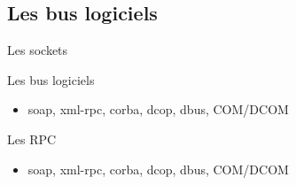 \subsection{Les bus logiciels}

\begin{frame}[fragile=singleslide]{Les sockets}
\end{frame} 

\begin{frame}[fragile=singleslide]{Les bus logiciels}
  \begin{itemize}  
    \item soap, xml-rpc, corba, dcop, dbus, COM/DCOM
  \end{itemize} 
\end{frame} 

\begin{frame}[fragile=singleslide]{Les RPC}
  \begin{itemize}  
    \item soap, xml-rpc, corba, dcop, dbus, COM/DCOM
  \end{itemize} 
\end{frame} 


